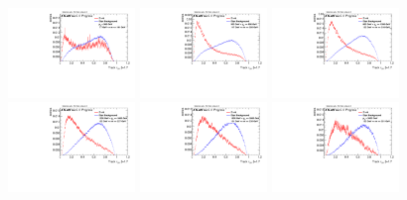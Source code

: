 \begin{figure}
\bigskip
\includegraphics[width=0.3\textwidth]{sascha_input/Appendix/Distributions/top/distributions/beta17/h_normal_tj_nSub32_17_bin1.pdf} \hspace{1mm}
\includegraphics[width=0.3\textwidth]{sascha_input/Appendix/Distributions/top/distributions/beta17/h_normal_tj_nSub32_17_bin2.pdf} \hspace{1mm}
\includegraphics[width=0.3\textwidth]{sascha_input/Appendix/Distributions/top/distributions/beta17/h_normal_tj_nSub32_17_bin3.pdf} 
\bigskip
\includegraphics[width=0.3\textwidth]{sascha_input/Appendix/Distributions/top/distributions/beta17/h_normal_tj_nSub32_17_bin4.pdf} \hspace{1mm}
\includegraphics[width=0.3\textwidth]{sascha_input/Appendix/Distributions/top/distributions/beta17/h_normal_tj_nSub32_17_bin5.pdf} \hspace{1mm}
\includegraphics[width=0.3\textwidth]{sascha_input/Appendix/Distributions/top/distributions/beta17/h_normal_tj_nSub32_17_bin6.pdf} 

\end{figure}
